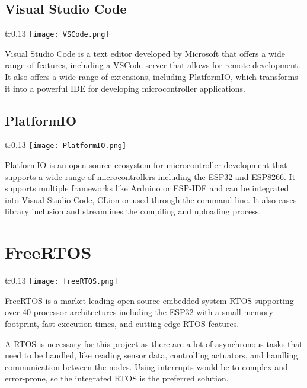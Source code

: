         \subsection{Visual Studio Code}
        \begin{wrapfigure}[3]{tr}{0.13\textwidth} %
            \vspace{-1.4cm}
            \hspace{3cm}
            \texttt{[image: VSCode.png]}
        \end{wrapfigure}
        Visual Studio Code \cite{visualStudioCode} is a text editor developed by Microsoft that
        offers a wide range of features, including a VSCode server that
        allows for remote development. It also offers a wide range of 
        extensions, including PlatformIO, which transforms it into a 
        powerful IDE for developing microcontroller applications.

        \subsection{PlatformIO}
        \begin{wrapfigure}[3]{tr}{0.13\textwidth} %
            \vspace{-1.4cm}
            \hspace{3cm}
            \texttt{[image: PlatformIO.png]}
        \end{wrapfigure}
        PlatformIO \cite{platformio} is an open-source ecosystem for microcontroller
        development that supports a wide range of microcontrollers including
        the ESP32 and ESP8266. It supports multiple frameworks like
        Arduino or ESP-IDF and can be integrated into Visual Studio Code,
        CLion or used through the command line. It also eases library inclusion
        and streamlines the compiling and uploading process. 

    \section{FreeRTOS}
        \begin{wrapfigure}[2]{tr}{0.13\textwidth} %
            \vspace{-1.4cm}
            \hspace{3cm}
            \texttt{[image: freeRTOS.png]}
        \end{wrapfigure}
    FreeRTOS \cite{freertos} is a market-leading open source embedded system RTOS supporting 
    over 40 processor architectures including the ESP32 with a small memory 
    footprint, fast execution times, and cutting-edge RTOS features.
    \par
    A RTOS is necessary for this project as there are a lot of asynchronous
    tasks that need to be handled, like reading sensor data, controlling
    actuators, and handling communication between the nodes. Using interrupts
    would be to complex and error-prone, so the integrated RTOS is the
    preferred solution.

